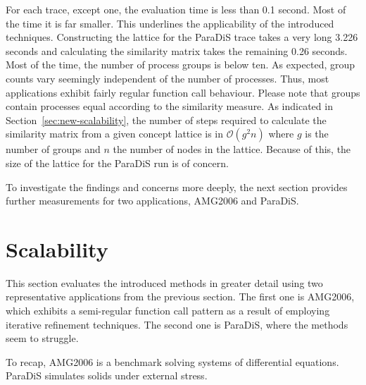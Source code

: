 \documentclass[a4paper, final, diplominf]{zih-template}
\begin{document}
For each trace, except one, the evaluation time is less than 0.1 second.
Most of the time it is far smaller.
This underlines the applicability of the introduced techniques.
Constructing the lattice for the ParaDiS trace takes a very long 3.226 seconds and calculating the similarity matrix takes the remaining 0.26 seconds.
Most of the time, the number of process groups is below ten.
As expected, group counts vary seemingly independent of the number of processes.
Thus, most applications exhibit fairly regular function call behaviour.
Please note that groups contain processes equal according to the similarity measure.
As indicated in Section~\ref{sec:new-scalability}, the number of steps required to calculate the similarity matrix from a given concept lattice is in $\mathcal{O}(g^2n)$ where $g$ is the number of groups and $n$ the number of nodes in the lattice.
Because of this, the size of the lattice for the ParaDiS run is of concern.

To investigate the findings and concerns more deeply, the next section provides further measurements for two applications, AMG2006 and ParaDiS.

\section{Scalability}
\label{sec:evaluation-scalability}
This section evaluates the introduced methods in greater detail using two representative applications from the previous section.
The first one is AMG2006, which exhibits a semi-regular function call pattern as a result of employing iterative refinement techniques.
The second one is ParaDiS, where the methods seem to struggle.

To recap, AMG2006 is a benchmark solving systems of differential equations.
ParaDiS simulates solids under external stress.

\end{document}
